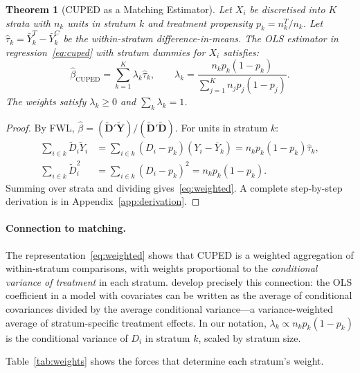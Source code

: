 \documentclass[12pt]{article}
\theoremstyle{plain}
\newtheorem{theorem}{Theorem}
\theoremstyle{definition}
\begin{document}
\begin{theorem}[CUPED as a Matching Estimator]
\label{thm:cuped_weighted}
Let $X_i$ be discretised into $K$ strata with $n_k$ units in stratum $k$
and treatment propensity $p_k = n_k^T/n_k$.
Let $\hat{\tau}_k = \bar{Y}_k^T - \bar{Y}_k^C$ be the within-stratum
difference-in-means.
The OLS estimator in regression~\eqref{eq:cuped} with stratum dummies for
$X_i$ satisfies:
\begin{equation}
  \hat{\beta}_{\text{CUPED}} = \sum_{k=1}^K \lambda_k \hat{\tau}_k,
  \qquad
  \lambda_k = \frac{n_k p_k(1-p_k)}{\sum_{j=1}^K n_j p_j(1-p_j)}.
  \label{eq:weighted}
\end{equation}
The weights satisfy $\lambda_k \geq 0$ and $\sum_k \lambda_k = 1$.
\end{theorem}

\begin{proof}
By FWL, $\hat{\beta} = (\tilde{\mathbf{D}}'\tilde{\mathbf{Y}}) /
(\tilde{\mathbf{D}}'\tilde{\mathbf{D}})$.
For units in stratum $k$:
\begin{align}
  \sum_{i \in k} \tilde{D}_i \tilde{Y}_i
    &= \sum_{i \in k} (D_i - p_k)(Y_i - \bar{Y}_k)
     = n_k p_k(1-p_k)\hat{\tau}_k, \\
  \sum_{i \in k} \tilde{D}_i^2
    &= \sum_{i \in k} (D_i - p_k)^2
     = n_k p_k(1-p_k).
\end{align}
Summing over strata and dividing gives~\eqref{eq:weighted}.
A complete step-by-step derivation is in Appendix~\ref{app:derivation}.
\end{proof}

\paragraph{Connection to matching.}
The representation~\eqref{eq:weighted} shows that CUPED is a weighted
aggregation of within-stratum comparisons, with weights proportional to
the \emph{conditional variance of treatment} in each stratum.
\citet[pp.~70--80]{angrist2009mostly} develop precisely this connection:
the OLS coefficient in a model with covariates can be written as the
average of conditional covariances divided by the average conditional
variance---a variance-weighted average of stratum-specific treatment effects.
In our notation, $\lambda_k \propto n_k p_k(1-p_k)$ is the conditional
variance of $D_i$ in stratum $k$, scaled by stratum size.

Table~\ref{tab:weights} shows the forces that determine each stratum's
weight.
\end{document}
